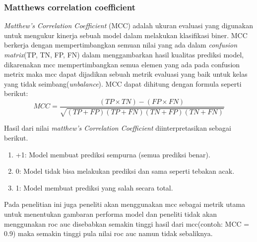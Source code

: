 \subsubsection{Matthews correlation coefficient}
\textit{Matthew’s Correlation Coefficient} 
(MCC) adalah ukuran evaluasi yang digunakan untuk mengukur kinerja sebuah model dalam melakukan klasifikasi biner. MCC berkerja dengan mempertimbangkan semuan nilai yang ada dalam \textit{confusion matrix}(TP, TN, FP, FN) dalam menggambarkan hasil kualitas prediksi model, dikarenakan mcc mempertimbangkan semua elemen yang ada pada confusion metrix maka mcc dapat dijadikan sebuah metrik evaluasi yang baik untuk kelas yang tidak seimbang(\textit{unbalance})\cite{chicco2020advantages}. MCC dapat dihitung dengan formula seperti berikut:\\
\begin{equation}
MCC = \frac{(TP \times TN) - (FP \times FN)}{\sqrt{(TP + FP)(TP + FN)(TN + FP)(TN + FN)}} 
\end{equation}
\label{eq:2.mcc}

Hasil dari nilai \textit{matthew's Correlation Coefficient} diinterpretasikan sebagai berikut.
\begin{enumerate}[noitemsep]
    \item +1: Model membuat prediksi sempurna (semua prediksi benar).
    \item 0: Model tidak bisa melakukan prediksi dan sama seperti tebakan acak.
    \item 1: Model membuat prediksi yang salah secara total.
\end{enumerate}

Pada penelitian ini juga peneliti akan menggunakan mcc sebagai metrik utama untuk menentukan gambaran performa model dan peneliti tidak akan menggunakan roc auc disebabkan semakin tinggi hasil dari mcc(contoh: MCC = 0.9) maka semakin tinggi pula nilai roc auc namun tidak sebaliknya\cite{chicco2023matthews}.


